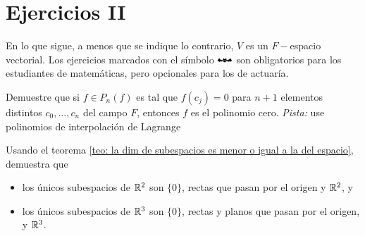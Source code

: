 \section{Ejercicios II}
En lo que sigue, a menos que se indique lo contrario,
$V$ es un $F-$espacio vectorial.
Los ejercicios marcados con el símbolo
$\mathbat$ son obligatorios para los estudiantes de matemáticas,
pero opcionales para los de actuaría.

\begin{ej}
Demuestre que si $f \in P_{n}(f)$ es tal que
$f(c_{j})=0$ para $n+1$ elementos distintos
$c_{0}, \ldots , c_{n}$ del campo $F$, entonces
$f$ es el polinomio cero. 
\textit{Pista:} use polinomios de interpolación de Lagrange
\end{ej}


\begin{ej}
Usando el teorema 
\ref{teo: la dim de subespacios es menor o igual a la del espacio}, 
demuestra que
\begin{itemize}
	\item los únicos subespacios de $\mathbb{R}^{2}$ son $\{ 0 \}$,
	rectas que pasan por el origen y $\mathbb{R}^{2}$, y
	\item los únicos subespacios de $\mathbb{R}^{3}$ son 
	$\{ 0 \}$, rectas y planos que pasan por el origen,
	y $\mathbb{R}^{3}$.
\end{itemize}
\end{ej}

\newpage